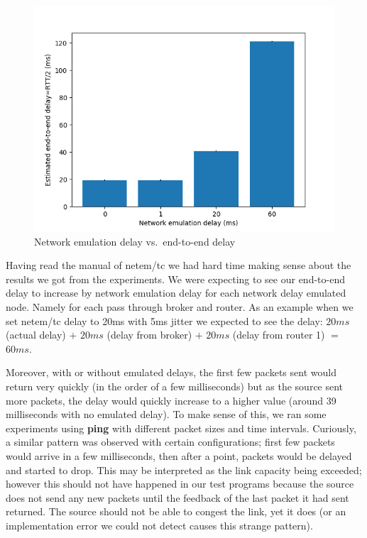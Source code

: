 \documentclass[conference]{IEEEtran}
\begin{document}
\begin{figure}
    \centering
    \includegraphics[scale=0.6]{graphics/plt}
    \caption{Network emulation delay vs.\ end-to-end delay}\label{fig:graph}
\end{figure}

Having read the manual of netem/tc we had hard time making sense about the results we got from the experiments. We were expecting to see our end-to-end delay to increase by network emulation delay for each network delay emulated node. Namely for each pass through broker and router. As an example when we set netem/tc delay to 20ms with 5ms jitter we expected to see the delay: $20ms$ (actual delay) $+$ $20ms$ (delay from broker) $+$ $20ms$ (delay from router 1) $=$ $60ms$.

Moreover, with or without emulated delays, the first few packets sent would return
very quickly (in the order of a few milliseconds) but as the source sent more packets,
the delay would quickly increase to a higher value (around 39 milliseconds with no
emulated delay). To make sense of this, we ran some experiments using \textbf{ping}
with different packet sizes and time intervals. Curiously, a similar pattern was observed
with certain configurations; first few packets would arrive in a few milliseconds, then
after a point, packets would be delayed and started to drop. This may be interpreted
as the link capacity being exceeded; however this should not have happened in our test programs
because the source does not send any new packets until the feedback of the last packet it had sent
returned. The source should not be able to congest the link, yet it does
(or an implementation error we could not detect causes this strange pattern).
\end{document}
